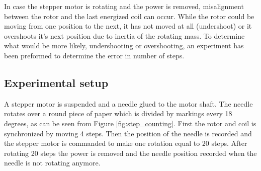 In case the stepper motor is rotating and the power is removed, misalignment between the rotor and the last energized coil can occur.
While the rotor could be moving from one position to the next, it has not moved at all (undershoot) or it overshoots it's next position due to inertia of the rotating mass. 
To determine what would be more likely, undershooting or overshooting, an experiment has been preformed to determine the error in number of steps.

\subsection{Experimental setup}

A stepper motor is suspended and a needle glued to the motor shaft.
The needle rotates over a round piece of paper which is divided by markings every 18 degrees, as can be seen from Figure \ref{fig:step_counting}.
First the rotor and coil is synchronized by moving 4 steps.
Then the position of the needle is recorded and the stepper motor is commanded to make one rotation equal to 20 steps.
After rotating 20 steps the power is removed and the needle position recorded when the needle is not rotating anymore.

